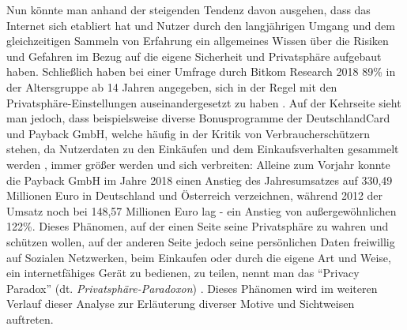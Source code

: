 Nun könnte man anhand der steigenden Tendenz davon ausgehen, dass das Internet sich etabliert hat und Nutzer durch den langjährigen Umgang und dem gleichzeitigen Sammeln von Erfahrung ein allgemeines Wissen über die Risiken und Gefahren im Bezug auf die eigene Sicherheit und Privatsphäre aufgebaut haben. Schließlich haben bei einer Umfrage durch 
Bitkom Research 2018 89\% in der Altersgruppe ab 14 Jahren angegeben, sich in der Regel mit den Privatsphäre-Einstellungen auseinandergesetzt zu haben \cite{Bitkom:2018aa}. \newline Auf der Kehrseite sieht man jedoch, dass beispielsweise diverse Bonusprogramme der DeutschlandCard und Payback GmbH, welche häufig in der Kritik von 
Verbraucherschützern stehen, da Nutzerdaten zu den Einkäufen und dem Einkaufsverhalten gesammelt werden \cite{Hatke:aa}, immer größer werden und sich verbreiten: Alleine zum Vorjahr konnte die Payback GmbH im Jahre 2018 einen Anstieg des Jahresumsatzes auf 330,49 Millionen Euro in Deutschland und Österreich verzeichnen, während 2012 der Umsatz noch bei 148,57 Millionen 
Euro lag \cite{Payback:2019aa} - ein Anstieg von außergewöhnlichen 122\%. \newline \newline Dieses Phänomen, auf der einen Seite seine Privatsphäre zu wahren und schützen wollen, auf der anderen Seite jedoch seine persönlichen Daten freiwillig auf Sozialen Netzwerken, beim Einkaufen oder durch die eigene Art und Weise, ein internetfähiges Gerät zu bedienen, zu teilen, nennt man das \enquote{Privacy Paradox} (dt. 
\textit{Privatsphäre-Paradoxon}) \cite{Barnes:2006aa}. Dieses Phänomen wird im weiteren Verlauf dieser Analyse zur Erläuterung diverser Motive und Sichtweisen auftreten.
